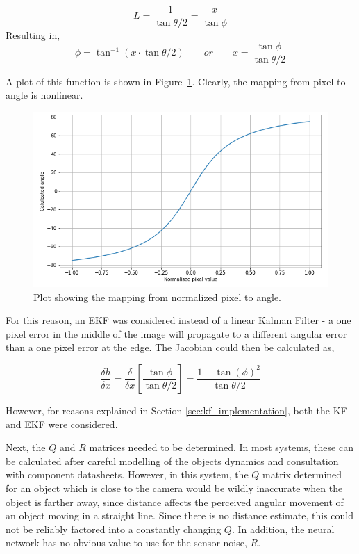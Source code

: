 \[ L = \frac{1}{\tan{\theta/2}} = \frac{x}{\tan{\phi}} \]
Resulting in,
\[ \phi = \tan^{-1}{\left( x\cdot{}\tan{ \theta/2 } \right) }
\qquad or
\qquad x = \frac{\tan{\phi}}{\tan{\theta/2}} \]

A plot of this function is shown in Figure~\ref{fig:pixel_to_angle_plot}. Clearly, the mapping from pixel to angle is nonlinear.

\begin{figure}[h!]
  \centering
  \includegraphics[width=\textwidth]{methodology/pixel_to_angle_plot}
  \caption{\label{fig:pixel_to_angle_plot}Plot showing the mapping from normalized pixel to angle.}
\end{figure}

For this reason, an EKF was considered instead of a linear Kalman Filter - a one pixel error in the middle of the image will propagate to a different angular error than a one pixel error at the edge. The Jacobian could then be calculated as,

\[ \frac{\delta h}{\delta x} = \frac{\delta}{\delta x} \left[ \frac{\tan{\phi}}{\tan{\theta/2}} \right] = \frac{1 + \tan{(\phi)}^2}{\tan{\theta/2}} \]

However, for reasons explained in Section \ref{sec:kf_implementation}, both the KF and EKF were considered.

Next, the $Q$ and $R$ matrices needed to be determined. In most systems, these can be calculated after careful modelling of the objects dynamics and consultation with component datasheets. However, in this system, the $Q$ matrix determined for an object which is close to the camera would be wildly inaccurate when the object is farther away, since distance affects the perceived angular movement of an object moving in a straight line. Since there is no distance estimate, this could not be reliably factored into a constantly changing $Q$. In addition, the neural network has no obvious value to use for the sensor noise, $R$.

